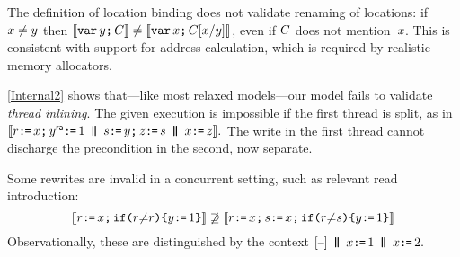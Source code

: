 


The definition of location binding does not validate renaming of locations:
if $x\neq y$ then
$\llbracket\texttt{var}\,y\texttt{;}\,\allowbreak C\rrbracket\neq\llbracket\texttt{var}\,x\texttt{;}\,\allowbreak C[x/y]\rrbracket$, even
if $C$ does not mention~$x$.  This is consistent with support for
address calculation, which is required by realistic memory allocators.

\ref{Internal2} shows that---like most relaxed models---our model
fails to validate \emph{thread inlining}.  The given execution is impossible
if the first thread is split, as in
\begin{math}
  \sem{\aReg\GETS x\SEMI
  y^\mRA\GETS 1\PAR
  \bReg\GETS y\SEMI
  z\GETS \bReg
  \PAR
  x\GETS z}.
\end{math}
The write in the first thread cannot discharge the precondition in the
second, now separate.


Some rewrites are invalid in a concurrent setting, such as
relevant read introduction:
\begin{displaymath}
  \llbracket r \texttt{:}\mkern-1mu\texttt{=}\, x \texttt{;}\,\allowbreak \texttt{if}\allowbreak\texttt{(}r {\neq} r\texttt{)} \allowbreak\texttt{\{} y \texttt{:}\mkern-1mu\texttt{=}\, 1 \texttt{\}}\rrbracket
  \not\supseteq
  \llbracket r \texttt{:}\mkern-1mu\texttt{=}\, x \texttt{;}\,\allowbreak s \texttt{:}\mkern-1mu\texttt{=}\, x  \texttt{;}\,\allowbreak \texttt{if}\allowbreak\texttt{(}r {\neq}s\texttt{)} \allowbreak\texttt{\{} y \texttt{:}\mkern-1mu\texttt{=}\, 1 \texttt{\}}\rrbracket
\end{displaymath}
Observationally, these are distinguished by the context %
\begin{math}
  \hole{} \PAR x\GETS1\PAR x\GETS2.
\end{math}

